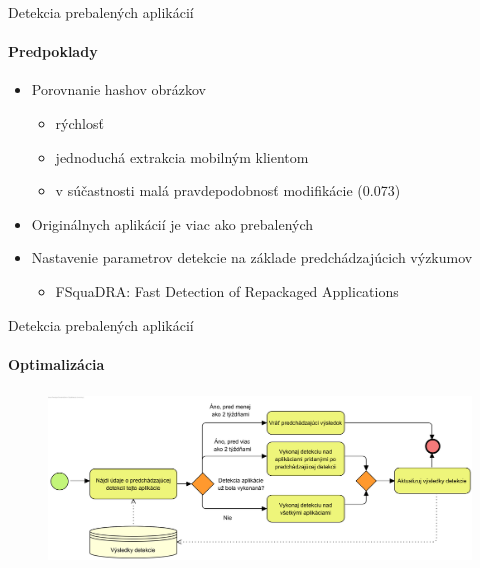 \documentclass{beamer}
\begin{document}
 \begin{frame}[label=lists]{Detekcia prebalených aplikácií}
 	 \framesubtitle{Predpoklady}
		\begin{itemize}
			\item Porovnanie hashov obrázkov
			\begin{itemize}
				\item rýchlosť
				\item jednoduchá extrakcia mobilným klientom
				\item v súčastnosti malá pravdepodobnosť modifikácie (0.073) \cite{a}
			\end{itemize}
			\item Originálnych aplikácií je viac ako prebalených
			\item Nastavenie parametrov detekcie na základe predchádzajúcich výzkumov
				\begin{itemize}
					\item FSquaDRA: Fast Detection of Repackaged Applications
				\end{itemize}
		\end{itemize}
  \end{frame}     
  
   \begin{frame}[label=lists]{Detekcia prebalených aplikácií}
 	 \framesubtitle{Optimalizácia}
		\begin{figure}[htb]
	  	\begin{center}
    		\includegraphics[height=4.5cm]{images/detection-optimalization.png}
  		\end{center}
	\end{figure}
  \end{frame}   
  
\end{document}
